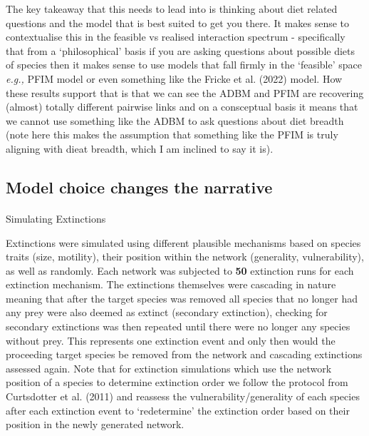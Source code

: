 \documentclass[
]{article}
\makeatletter
\let\oldparagraph\paragraph
\renewcommand{\paragraph}{
    \@ifstar
      \xxxParagraphStar
      \xxxParagraphNoStar
  }
\newcommand{\xxxParagraphStar}[1]{\oldparagraph*{#1}\mbox{}}
\newcommand{\xxxParagraphNoStar}[1]{\oldparagraph{#1}\mbox{}}
\makeatother
\begin{document}
The key takeaway that this needs to lead into is thinking about diet
related questions and the model that is best suited to get you there. It
makes sense to contextualise this in the feasible vs realised
interaction spectrum - specifically that from a `philosophical' basis if
you are asking questions about possible diets of species then it makes
sense to use models that fall firmly in the `feasible' space
\emph{e.g.,} PFIM model or even something like the Fricke et al. (2022)
model. How these results support that is that we can see the ADBM and
PFIM are recovering (almost) totally different pairwise links and on a
consceptual basis it means that we cannot use something like the ADBM to
ask questions about diet breadth (note here this makes the assumption
that something like the PFIM is truly aligning with dieat breadth, which
I am inclined to say it is).

\subsection{Model choice changes the
narrative}\label{model-choice-changes-the-narrative}

\paragraph{Simulating Extinctions}\label{simulating-extinctions}

Extinctions were simulated using different plausible mechanisms based on
species traits (size, motility), their position within the network
(generality, vulnerability), as well as randomly. Each network was
subjected to \textbf{50} extinction runs for each extinction mechanism.
The extinctions themselves were cascading in nature meaning that after
the target species was removed all species that no longer had any prey
were also deemed as extinct (secondary extinction), checking for
secondary extinctions was then repeated until there were no longer any
species without prey. This represents one extinction event and only then
would the proceeding target species be removed from the network and
cascading extinctions assessed again. Note that for extinction
simulations which use the network position of a species to determine
extinction order we follow the protocol from Curtsdotter et al. (2011)
and reassess the vulnerability/generality of each species after each
extinction event to `redetermine' the extinction order based on their
position in the newly generated network.
\end{document}
